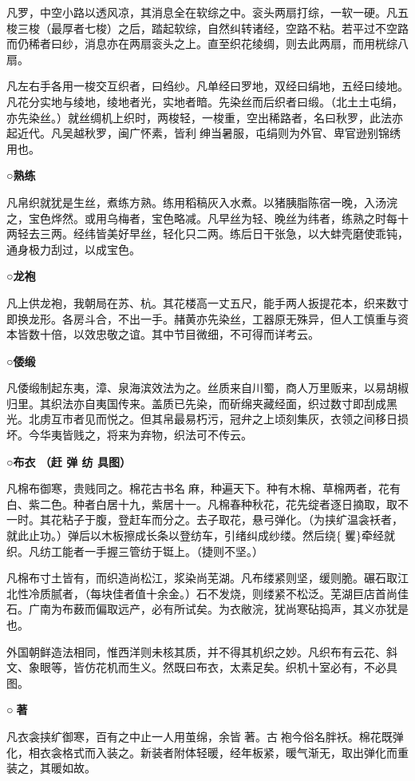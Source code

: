 \documentclass[]{article}
\begin{document}
凡罗，中空小路以透风凉，其消息全在软综之中。衮头两扇打综，一软一硬。凡五梭三梭（最厚者七梭）之后，踏起软综，自然纠转诸经，空路不粘。若平过不空路而仍稀者曰纱，消息亦在两扇衮头之上。直至织花绫绸，则去此两扇，而用桄综八扇。

凡左右手各用一梭交互织者，曰绉纱。凡单经曰罗地，双经曰绢地，五经曰绫地。凡花分实地与绫地，绫地者光，实地者暗。先染丝而后织者曰缎。（北土土屯绢，亦先染丝。）就丝绸机上织时，两梭轻，一梭重，空出稀路者，名曰秋罗，此法亦起近代。凡吴越秋罗，闽广怀素，皆利绅当暑服，屯绢则为外官、卑官逊别锦绣用也。

\textbf{○熟练}

凡帛织就犹是生丝，煮练方熟。练用稻稿灰入水煮。以猪胰脂陈宿一晚，入汤浣之，宝色烨然。或用乌梅者，宝色略减。凡早丝为轻、晚丝为纬者，练熟之时每十两轻去三两。经纬皆美好早丝，轻化只二两。练后日干张急，以大蚌壳磨使乖钝，通身极力刮过，以成宝色。

\textbf{○龙袍}

凡上供龙袍，我朝局在苏、杭。其花楼高一丈五尺，能手两人扳提花本，织来数寸即换龙形。各房斗合，不出一手。赭黄亦先染丝，工器原无殊异，但人工慎重与资本皆数十倍，以效忠敬之谊。其中节目微细，不可得而详考云。

\textbf{○倭缎}

凡倭缎制起东夷，漳、泉海滨效法为之。丝质来自川蜀，商人万里贩来，以易胡椒归里。其织法亦自夷国传来。盖质已先染，而斫绵夹藏经面，织过数寸即刮成黑光。北虏互市者见而悦之。但其帛最易朽污，冠弁之上顷刻集灰，衣领之间移日损坏。今华夷皆贱之，将来为弃物，织法可不传云。

\textbf{○布衣 （赶 弹 纺 具图）}

凡棉布御寒，贵贱同之。棉花古书名麻，种遍天下。种有木棉、草棉两者，花有白、紫二色。种者白居十九，紫居十一。凡棉春种秋花，花先绽者逐日摘取，取不一时。其花粘子于腹，登赶车而分之。去子取花，悬弓弹化。（为挟纩温衾袄者，就此止功。）弹后以木板擦成长条以登纺车，引绪纠成纱缕。然后绕\{矍\}牵经就织。凡纺工能者一手握三管纺于铤上。（捷则不坚。）

凡棉布寸土皆有，而织造尚松江，浆染尚芜湖。凡布缕紧则坚，缓则脆。碾石取江北性冷质腻者，（每块佳者值十余金。）石不发烧，则缕紧不松泛。芜湖巨店首尚佳石。广南为布薮而偏取远产，必有所试矣。为衣敝浣，犹尚寒砧捣声，其义亦犹是也。

外国朝鲜造法相同，惟西洋则未核其质，并不得其机织之妙。凡织布有云花、斜文、象眼等，皆仿花机而生义。然既曰布衣，太素足矣。织机十室必有，不必具图。

\textbf{○著}

凡衣衾挟纩御寒，百有之中止一人用茧绵，余皆著。古袍今俗名胖袄。棉花既弹化，相衣衾格式而入装之。新装者附体轻暖，经年板紧，暖气渐无，取出弹化而重装之，其暖如故。
\end{document}
